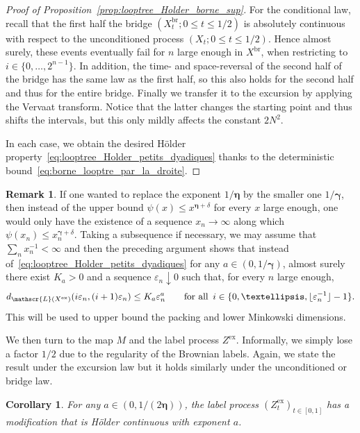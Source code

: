 \documentclass[british, a4paper,11pt]{article}
\numberwithin{equation}{section}
\newtheorem{cor}[thm]{Corollary}
\theoremstyle{definition}
\newtheorem{rem}[thm]{Remark}
\newcommand{\Loop}{\mathscr{L}}
\newcommand{\bdgamma}{\boldsymbol{\gamma}}
\newcommand{\bdeta}{\boldsymbol{\eta}}
\newcommand{\exc}{\mathrm{ex}}
\newcommand{\br}{\mathrm{br}}
\begin{document}
\begin{proof}[Proof of Proposition~\ref{prop:looptree_Holder_borne_sup}]
For the conditional law, recall that the first half the bridge $(X^{\br}_{t} ; 0 \leq t \leq 1/2)$ is absolutely continuous with respect to the unconditioned process $(X_{t} ; 0 \leq t \leq 1/2)$.
Hence almost surely, these events eventually fail for $n$ large enough in $X^{\br}$, when restricting to $i \in \{0, \dots, 2^{n-1}\}$.
In addition, the time- and space-reversal of the second half of the bridge has the same law as the first half, so this also holds for the second half and thus for the entire bridge.
Finally we transfer it to the excursion by applying the Vervaat transform. Notice that the latter changes the starting point and thus shifts the intervals, but this only mildly affects the constant $2 N^2$.

In each case, we obtain the desired H\"older property~\eqref{eq:looptree_Holder_petits_dyadiques} thanks to the deterministic bound~\eqref{eq:borne_looptre_par_la_droite}.
\end{proof}



\begin{rem}\label{rem:looptree_Holder_borne_sup}
If one wanted to replace the exponent $1/\bdeta$ by the smaller one $1/\bdgamma$, then instead of the upper bound 
$\psi(x) \leq x^{\bdeta+\delta}$ for every $x$ large enough, one would only have the existence of a sequence $x_{n} \to \infty$ along which $\psi(x_{n}) \leq x_{n}^{\bdgamma+\delta}$. Taking a subsequence if necessary, we may assume that $\sum_{n} x_{n}^{-1} < \infty$ and then the preceding argument shows that instead of~\eqref{eq:looptree_Holder_petits_dyadiques} for any $a \in (0, 1/\bdgamma)$, almost surely there exist $K_{a} > 0$ and a sequence $\varepsilon_{n} \downarrow 0$ such that, for every $n$ large enough,
\[d_{\Loop(X^{\exc})}(i \varepsilon_{n}, (i+1) \varepsilon_{n}) \leq K_{a} \varepsilon_{n}^{a}
\qquad\text{for all}\enskip i \in \{0, \dots, \lfloor \varepsilon_{n}^{-1}\rfloor-1\}.\]
This will be used to upper bound the packing and lower Minkowski dimensions.
\end{rem}


We then turn to the map $M$ and the label process $Z^{\exc}$.
Informally, we simply lose a factor $1/2$ due to the regularity of the Brownian labels.
Again, we state the result under the excursion law but it holds similarly under the unconditioned or bridge law.


\begin{cor}\label{cor:labels_Holder}
For any $a \in(0, 1/(2\bdeta))$, the label process $(Z^{\exc}_t)_{t \in [0,1]}$ has a modification that is H\"older continuous with exponent $a$.
\end{cor}
\end{document}
